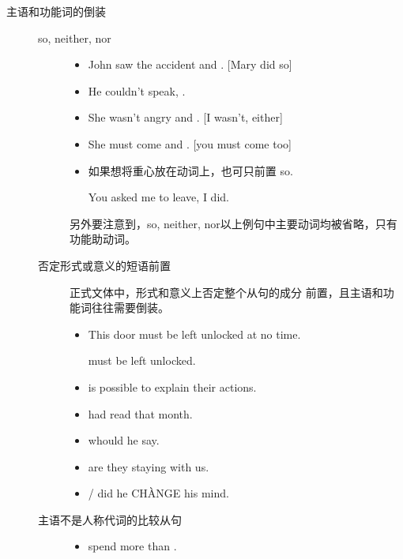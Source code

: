 \begin{description}
\item[主语和功能词的倒装]
  \begin{description}
  \item[so, neither, nor]
    \begin{itemize}
    \item John saw the accident and . [Mary did so]

    \item He couldn't speak, .
    \item She wasn't angry and . [I wasn't, either]
    \item She must come and . [you must come too]

    \item 如果想将重心放在动词上，也可只前置 so.

      You asked me to leave,  I did.
    \end{itemize}

    另外要注意到，so, neither, nor以上例句中主要动词均被省略，只有功能助动词。

  \item[否定形式或意义的短语前置] 正式文体中，形式和意义上否定整个从句的成分
    前置，且主语和功能词往往需要倒装。
    \begin{itemize}
    \item This door must be left unlocked at no time.

       must  be left unlocked.

    \item {} is  possible to explain their actions.

    \item {} had  read that month.

    \item {} whould he say.

    \item {} are they staying with us.


    \item {} / did he CH\`ANGE his mind.
    \end{itemize}

  \item[主语不是人称代词的比较从句]
    \begin{itemize}

    \item {} spend more than .


\end{itemize}
\end{description}
\end{description}
